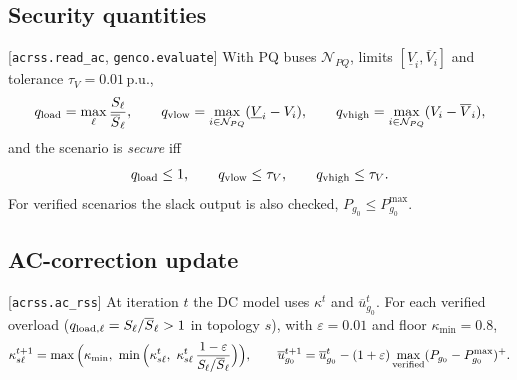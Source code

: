 \subsection{Security quantities}
[\texttt{acrss.read\_ac}, \texttt{genco.evaluate}] With PQ buses $\mathcal N_{PQ}$, limits
$[\underline V_i,\overline V_i]$ and tolerance $\tau_V=0.01$\,p.u.,
\begin{equation}
q_{\rm load}=\max_{\ell}\frac{S_\ell}{\overline S_\ell},\qquad
q_{\rm vlow}=\max_{i\in\mathcal N_{PQ}}(\underline V_i-V_i),\qquad
q_{\rm vhigh}=\max_{i\in\mathcal N_{PQ}}(V_i-\overline V_i),
\label{eq:q}
\end{equation}
and the scenario is \emph{secure} iff
\begin{equation}
q_{\rm load}\le1,\qquad q_{\rm vlow}\le\tau_V,\qquad q_{\rm vhigh}\le\tau_V .
\label{eq:secure}
\end{equation}
For verified scenarios the slack output is also checked, $P_{g_0}\le P^{\max}_{g_0}$.

\subsection{AC-correction update}
[\texttt{acrss.ac\_rss}] At iteration $t$ the DC model uses $\kappa^t$ and $\overline u^t_{g_0}$.
For each verified overload ($q_{{\rm load},\ell}=S_\ell/\overline S_\ell>1$ in topology $s$),
with $\varepsilon=0.01$ and floor $\kappa_{\min}=0.8$,
\begin{equation}
\kappa^{t+1}_{s\ell}=\max\Big(\kappa_{\min},\ \min\Big(\kappa^t_{s\ell},\ \kappa^t_{s\ell}\,\frac{1-\varepsilon}{S_\ell/\overline S_\ell}\Big)\Big),
\qquad
\overline u^{t+1}_{g_0}=\overline u^{t}_{g_0}-(1+\varepsilon)\max_{\rm verified}(P_{g_0}-P^{\max}_{g_0})^+ .
\label{eq:derate}
\end{equation}

